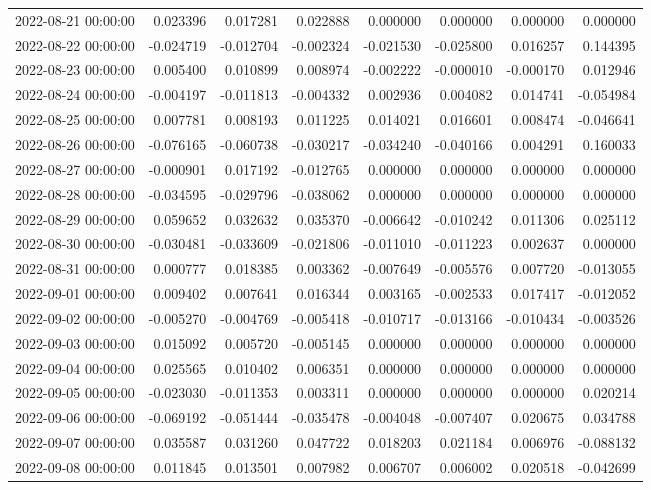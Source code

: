 \begin{tabular}{lrrrrrrr}
2022-08-21 00:00:00 & 0.023396 & 0.017281 & 0.022888 & 0.000000 & 0.000000 & 0.000000 & 0.000000 \\
2022-08-22 00:00:00 & -0.024719 & -0.012704 & -0.002324 & -0.021530 & -0.025800 & 0.016257 & 0.144395 \\
2022-08-23 00:00:00 & 0.005400 & 0.010899 & 0.008974 & -0.002222 & -0.000010 & -0.000170 & 0.012946 \\
2022-08-24 00:00:00 & -0.004197 & -0.011813 & -0.004332 & 0.002936 & 0.004082 & 0.014741 & -0.054984 \\
2022-08-25 00:00:00 & 0.007781 & 0.008193 & 0.011225 & 0.014021 & 0.016601 & 0.008474 & -0.046641 \\
2022-08-26 00:00:00 & -0.076165 & -0.060738 & -0.030217 & -0.034240 & -0.040166 & 0.004291 & 0.160033 \\
2022-08-27 00:00:00 & -0.000901 & 0.017192 & -0.012765 & 0.000000 & 0.000000 & 0.000000 & 0.000000 \\
2022-08-28 00:00:00 & -0.034595 & -0.029796 & -0.038062 & 0.000000 & 0.000000 & 0.000000 & 0.000000 \\
2022-08-29 00:00:00 & 0.059652 & 0.032632 & 0.035370 & -0.006642 & -0.010242 & 0.011306 & 0.025112 \\
2022-08-30 00:00:00 & -0.030481 & -0.033609 & -0.021806 & -0.011010 & -0.011223 & 0.002637 & 0.000000 \\
2022-08-31 00:00:00 & 0.000777 & 0.018385 & 0.003362 & -0.007649 & -0.005576 & 0.007720 & -0.013055 \\
2022-09-01 00:00:00 & 0.009402 & 0.007641 & 0.016344 & 0.003165 & -0.002533 & 0.017417 & -0.012052 \\
2022-09-02 00:00:00 & -0.005270 & -0.004769 & -0.005418 & -0.010717 & -0.013166 & -0.010434 & -0.003526 \\
2022-09-03 00:00:00 & 0.015092 & 0.005720 & -0.005145 & 0.000000 & 0.000000 & 0.000000 & 0.000000 \\
2022-09-04 00:00:00 & 0.025565 & 0.010402 & 0.006351 & 0.000000 & 0.000000 & 0.000000 & 0.000000 \\
2022-09-05 00:00:00 & -0.023030 & -0.011353 & 0.003311 & 0.000000 & 0.000000 & 0.000000 & 0.020214 \\
2022-09-06 00:00:00 & -0.069192 & -0.051444 & -0.035478 & -0.004048 & -0.007407 & 0.020675 & 0.034788 \\
2022-09-07 00:00:00 & 0.035587 & 0.031260 & 0.047722 & 0.018203 & 0.021184 & 0.006976 & -0.088132 \\
2022-09-08 00:00:00 & 0.011845 & 0.013501 & 0.007982 & 0.006707 & 0.006002 & 0.020518 & -0.042699 \\

\end{tabular}
